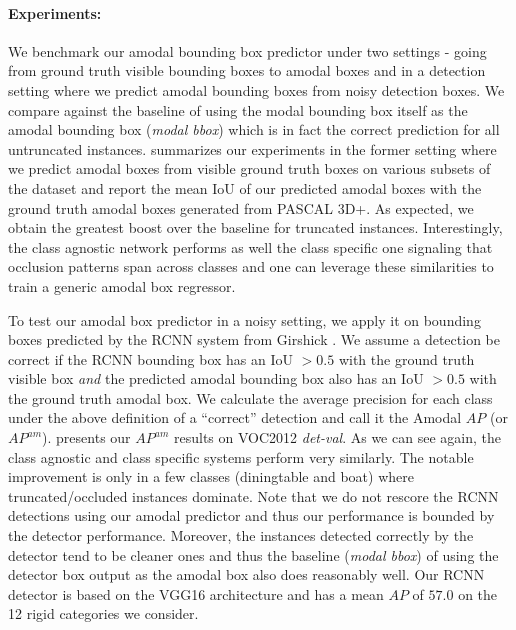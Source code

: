 \paragraph{Experiments:} We benchmark our amodal bounding box predictor under two settings - going from ground truth visible bounding boxes to amodal boxes and in a detection setting where we predict amodal bounding boxes from noisy detection boxes. We compare against the baseline of using the modal bounding box itself as the amodal bounding box (\textit{modal bbox}) which is in fact the correct prediction for all untruncated instances.  summarizes our experiments in the former setting where we predict amodal boxes from visible ground truth boxes on various subsets of the dataset and report the mean IoU of our predicted amodal boxes with the ground truth amodal boxes generated from PASCAL 3D+. As expected, we obtain the greatest boost over the baseline for truncated instances. Interestingly, the class agnostic network performs as well the class specific one signaling that occlusion patterns span across classes and one can leverage these similarities to train a generic amodal box regressor. 

To test our amodal box predictor in a noisy setting, we apply it on bounding boxes predicted by the RCNN\cite{girshick2013rich} system from Girshick \etal. We assume a detection be correct if the RCNN bounding box has an IoU $> 0.5$ with the ground truth visible box \textit{and} the predicted amodal bounding box also has an IoU $> 0.5$ with the ground truth amodal box. We calculate the average precision for each class under the above definition of a ``correct'' detection and call it the Amodal $AP$ (or $AP^{am}$).  presents our $AP^{am}$ results on VOC2012 \textit{det-val}. As we can see again, the class agnostic and class specific systems perform very similarly. The notable improvement is only in a few classes (\eg diningtable and boat) where truncated/occluded instances dominate. Note that we do not rescore the RCNN detections using our amodal predictor and thus our performance is bounded by the detector performance. Moreover, the instances detected correctly by the detector tend to be cleaner ones and thus the baseline (\textit{modal bbox}) of using the detector box output as the amodal box also does reasonably well. Our RCNN detector is based on the VGG16 \cite{simonyan2014very} architecture and has a mean $AP$ of $57.0$ on the 12 rigid categories we consider.

